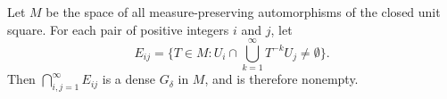 Let $M$ be the space of all measure-preserving automorphisms of the closed unit square. For each pair of positive integers $i$ and $j$, let
$$E_{ij} = \{ T \in M : U_i \cap \bigcup_{k=1}^{\infty} T^{-k} U_j \neq \emptyset \}.$$
Then $\bigcap_{i,j=1}^{\infty} E_{ij}$ is a dense $G_{\delta}$ in $M$, and is therefore nonempty.
